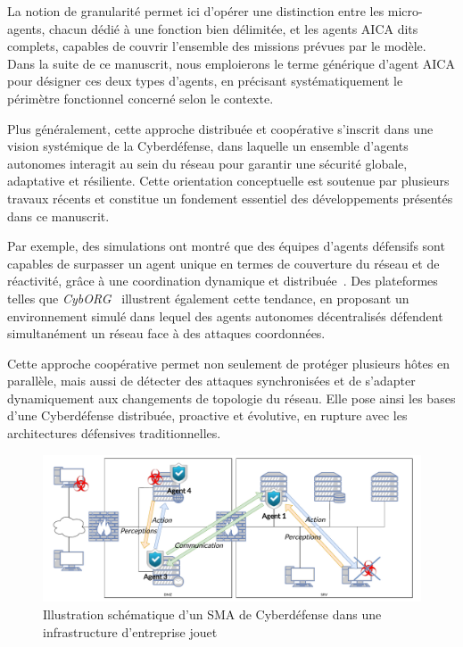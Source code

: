 La notion de granularité permet ici d'opérer une distinction entre les micro-agents, chacun dédié à une fonction bien délimitée, et les agents \ac{AICA} dits complets, capables de couvrir l'ensemble des missions prévues par le modèle. Dans la suite de ce manuscrit, nous emploierons le terme générique d'agent \ac{AICA} pour désigner ces deux types d'agents, en précisant systématiquement le périmètre fonctionnel concerné selon le contexte.

Plus généralement, cette approche distribuée et coopérative s'inscrit dans une vision systémique de la Cyberdéfense, dans laquelle un ensemble d'agents autonomes interagit au sein du réseau pour garantir une sécurité globale, adaptative et résiliente. Cette orientation conceptuelle est soutenue par plusieurs travaux récents et constitue un fondement essentiel des développements présentés dans ce manuscrit.


Par exemple, des simulations ont montré que des équipes d'agents défensifs sont capables de surpasser un agent unique en termes de couverture du réseau et de réactivité, grâce à une coordination dynamique et distribuée~\cite{RLResilientCyberdefense2024}.
Des plateformes telles que \textit{CybORG}~\cite{cage_challenge_3_announcement} illustrent également cette tendance, en proposant un environnement simulé dans lequel des agents autonomes décentralisés défendent simultanément un réseau face à des attaques coordonnées.

Cette approche coopérative permet non seulement de protéger plusieurs hôtes en parallèle, mais aussi de détecter des attaques synchronisées et de s'adapter dynamiquement aux changements de topologie du réseau. Elle pose ainsi les bases d'une Cyberdéfense distribuée, proactive et évolutive, en rupture avec les architectures défensives traditionnelles.


\begin{figure}[h]
    \centering
    \includegraphics[width=\linewidth]{figures/infra_MAS_illustration.pdf}
    \caption{Illustration schématique d'un \ac{SMA} de Cyberdéfense dans une infrastructure d'entreprise jouet}
    \label{fig:distributed_sma}
\end{figure}

